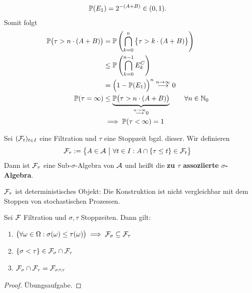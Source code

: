 \begin{beisp}
\begin{align*}
\P(E_1)=2^{-(A+B)}\in(0,1).
\end{align*}
Somit folgt
\begin{align*}
\P\big(\tau>n\cdot(A+B)\big)&=\P\left(\bigcap\limits_{k=0}^n\big\lbrace\tau > k\cdot (A+B)\big\rbrace\right)\\
&\leq\P\left(\bigcap\limits_{k=0}^{n-1} E_k^C\right)\\
&=\Big(1-\P(E_1)\Big)^n\stackrel{n\to\infty}{\longrightarrow}0\\
\P(\tau=\infty)&\leq\underbrace{\P\big(\tau> n\cdot(A+B)\big)}_{\stackrel{n\to\infty}{\longrightarrow}0}\qquad\forall n\in\N_0\\
&\implies
\P(\tau<\infty)=1
\end{align*}
\end{beisp}

\begin{defi}
Sei $(\F_t)_{t\in I}$ eine Filtration und $\tau$ eine Stoppzeit bgzl. dieser. Wir definieren 
\begin{align*}
\F_\tau:=\big\lbrace A\in\A~\big|~\forall t\in I:A\cap\lbrace\tau\leq t\rbrace\in\F_t\big\rbrace
\end{align*}
Dann ist $\F_\tau$ eine Sub-$\sigma$-Algebra von $\A$ und heißt die \textbf{zu $\tau$ assoziierte $\sigma$-Algebra}.
\end{defi}

\begin{bemerkung}
$\F_\tau$ ist deterministisches Objekt: Die Konstruktion ist nicht vergleichbar mit dem Stoppen von stochastischen Prozessen.
\end{bemerkung}

\setcounter{satz}{2} %
\begin{lemma}\label{lemma3.3}
Sei $\F$ Filtration und $\sigma,\tau$ Stoppzeiten. Dann gilt:
\begin{enumerate}[label=(\alph*)]
\item $\begin{aligned}
\big(\forall\omega\in\Omega:\sigma(\omega)\leq\tau(\omega)\big)\implies\F_\sigma\subseteq\F_\tau
\end{aligned}$
\item $\begin{aligned}
\lbrace\sigma<\tau\rbrace\in\F_\sigma\cap\F_\tau
\end{aligned}$
\item $\begin{aligned}
\F_\sigma\cap\F_\tau=\F_{\sigma\wedge\tau}
\end{aligned}$
\end{enumerate}
\end{lemma}
\begin{proof}
Übungsaufgabe.
\end{proof}

